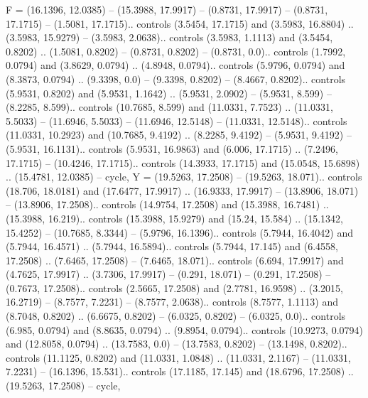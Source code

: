 {F} = {(16.1396, 12.0385) -- (15.3988, 17.9917) -- (0.8731, 17.9917) -- (0.8731, 17.1715) -- (1.5081, 17.1715).. controls (3.5454, 17.1715) and (3.5983, 16.8804) .. (3.5983, 15.9279) -- (3.5983, 2.0638).. controls (3.5983, 1.1113) and (3.5454, 0.8202) .. (1.5081, 0.8202) -- (0.8731, 0.8202) -- (0.8731, 0.0).. controls (1.7992, 0.0794) and (3.8629, 0.0794) .. (4.8948, 0.0794).. controls (5.9796, 0.0794) and (8.3873, 0.0794) .. (9.3398, 0.0) -- (9.3398, 0.8202) -- (8.4667, 0.8202).. controls (5.9531, 0.8202) and (5.9531, 1.1642) .. (5.9531, 2.0902) -- (5.9531, 8.599) -- (8.2285, 8.599).. controls (10.7685, 8.599) and (11.0331, 7.7523) .. (11.0331, 5.5033) -- (11.6946, 5.5033) -- (11.6946, 12.5148) -- (11.0331, 12.5148).. controls (11.0331, 10.2923) and (10.7685, 9.4192) .. (8.2285, 9.4192) -- (5.9531, 9.4192) -- (5.9531, 16.1131).. controls (5.9531, 16.9863) and (6.006, 17.1715) .. (7.2496, 17.1715) -- (10.4246, 17.1715).. controls (14.3933, 17.1715) and (15.0548, 15.6898) .. (15.4781, 12.0385) -- cycle},
{Y} = {(19.5263, 17.2508) -- (19.5263, 18.071).. controls (18.706, 18.0181) and (17.6477, 17.9917) .. (16.9333, 17.9917) -- (13.8906, 18.071) -- (13.8906, 17.2508).. controls (14.9754, 17.2508) and (15.3988, 16.7481) .. (15.3988, 16.219).. controls (15.3988, 15.9279) and (15.24, 15.584) .. (15.1342, 15.4252) -- (10.7685, 8.3344) -- (5.9796, 16.1396).. controls (5.7944, 16.4042) and (5.7944, 16.4571) .. (5.7944, 16.5894).. controls (5.7944, 17.145) and (6.4558, 17.2508) .. (7.6465, 17.2508) -- (7.6465, 18.071).. controls (6.694, 17.9917) and (4.7625, 17.9917) .. (3.7306, 17.9917) -- (0.291, 18.071) -- (0.291, 17.2508) -- (0.7673, 17.2508).. controls (2.5665, 17.2508) and (2.7781, 16.9598) .. (3.2015, 16.2719) -- (8.7577, 7.2231) -- (8.7577, 2.0638).. controls (8.7577, 1.1113) and (8.7048, 0.8202) .. (6.6675, 0.8202) -- (6.0325, 0.8202) -- (6.0325, 0.0).. controls (6.985, 0.0794) and (8.8635, 0.0794) .. (9.8954, 0.0794).. controls (10.9273, 0.0794) and (12.8058, 0.0794) .. (13.7583, 0.0) -- (13.7583, 0.8202) -- (13.1498, 0.8202).. controls (11.1125, 0.8202) and (11.0331, 1.0848) .. (11.0331, 2.1167) -- (11.0331, 7.2231) -- (16.1396, 15.531).. controls (17.1185, 17.145) and (18.6796, 17.2508) .. (19.5263, 17.2508) -- cycle},
